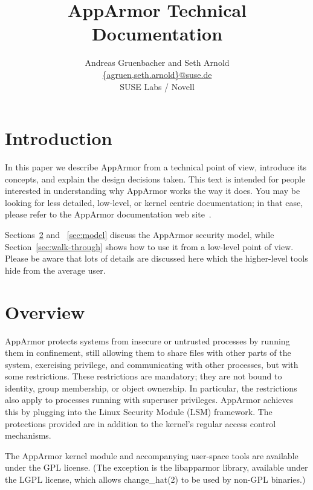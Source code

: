 \documentclass[a4paper]{article}
\title{AppArmor Technical Documentation}
\author{Andreas Gruenbacher and Seth Arnold \\
\url{{agruen,seth.arnold}@suse.de} \\
SUSE Labs / Novell}
\begin{document}
\maketitle

\tableofcontents

\newpage


\section{Introduction}

In this paper we describe AppArmor from a technical point of view,
introduce its concepts, and explain the design decisions taken.  This
text is intended for people interested in understanding why AppArmor
works the way it does.  You may be looking for less detailed, low-level,
or kernel centric documentation; in that case, please refer to the
AppArmor documentation web site~\cite{apparmor}.

Sections~\ref{sec:overview} and ~\ref{sec:model} discuss the AppArmor
security model, while Section~\ref{sec:walk-through} shows how to use it
from a low-level point of view.  Please be aware that lots of details
are discussed here which the higher-level tools hide from the average
user.


\section{Overview}
\label{sec:overview}

AppArmor protects systems from insecure or untrusted processes by
running them in confinement, still allowing them to share files with
other parts of the system, exercising privilege, and communicating with
other processes, but with some restrictions.  These restrictions are
mandatory; they are not bound to identity, group membership, or object
ownership.  In particular, the restrictions also apply to processes
running with superuser privileges.  AppArmor achieves this by plugging
into the Linux Security Module (LSM) framework.  The protections
provided are in addition to the kernel's regular access control
mechanisms.

The AppArmor kernel module and accompanying user-space tools are
available under the GPL license. (The exception is the libapparmor
library, available under the LGPL license, which allows change\_hat(2)
to be used by non-GPL binaries.)
\end{document}
